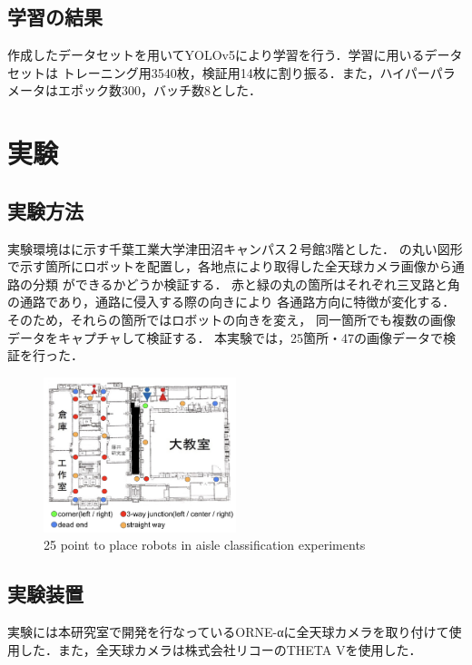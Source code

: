 \documentclass[10pt]{jarticle}
\begin{document}
     \subsection{学習の結果}
     作成したデータセットを用いてYOLOv5\cite{yolov5}により学習を行う．学習に用いるデータセットは
     トレーニング用3540枚，検証用14枚に割り振る．また，ハイパーパラメータはエポック数300，バッチ数8とした．

    \section{実\hspace{2zw}験}%
     \subsection{実験方法}
     実験環境はに示す千葉工業大学津田沼キャンパス２号館3階とした．
     の丸い図形で示す箇所にロボットを配置し，各地点により取得した全天球カメラ画像から通路の分類
     ができるかどうか検証する．
     赤と緑の丸の箇所はそれぞれ三叉路と角の通路であり，通路に侵入する際の向きにより
     各通路方向に特徴が変化する．そのため，それらの箇所ではロボットの向きを変え，
     同一箇所でも複数の画像データをキャプチャして検証する．
     本実験では，25箇所・47の画像データで検証を行った．

        \begin{figure}[!b]
            \includegraphics[width=0.5\textwidth]{./fig/new_experimental_point.png}
            \caption{25 point to place robots in aisle classification experiments}
            \label{fig:experiment_point}
        \end{figure}

     \subsection{実験装置}%
     実験には本研究室で開発を行なっているORNE-αに全天球カメラを取り付けて使用した．また，全天球カメラは株式会社リコーのTHETA Vを使用した．
    
\end{document}
